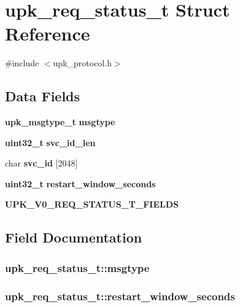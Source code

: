 \section{upk\_\-req\_\-status\_\-t Struct Reference}
\label{structupk__req__status__t}


{\ttfamily \#include $<$upk\_\-protocol.h$>$}

\subsection*{Data Fields}
\begin{DoxyCompactItemize}
\item 
{\bf upk\_\-msgtype\_\-t} {\bf msgtype}
\item 
{\bf uint32\_\-t} {\bf svc\_\-id\_\-len}
\item 
char {\bf svc\_\-id} [2048]
\item 
{\bf uint32\_\-t} {\bf restart\_\-window\_\-seconds}
\item 
{\bf UPK\_\-V0\_\-REQ\_\-STATUS\_\-T\_\-FIELDS}
\end{DoxyCompactItemize}


\subsection{Field Documentation}
\subsubsection[{msgtype}]{ {\bf upk\_\-req\_\-status\_\-t::msgtype}}\label{structupk__req__status__t_afc2b22f1f837e86dbf953f22d6cb2fe4}
\subsubsection[{restart\_\-window\_\-seconds}]{ {\bf upk\_\-req\_\-status\_\-t::restart\_\-window\_\-seconds}}\label{structupk__req__status__t_a3145782ac3dfd60ff1f791a49a61c6e6}
